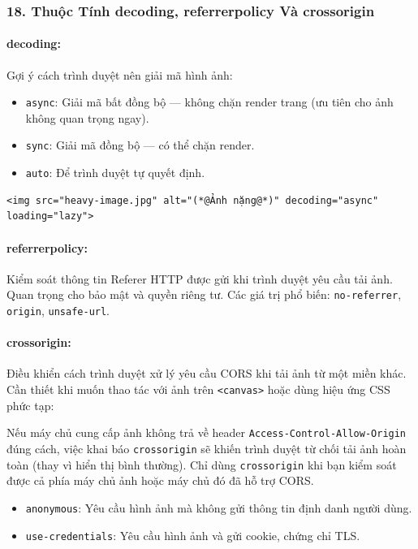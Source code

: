 \documentclass[11pt,oneside]{book}
\newcommand{\codeinline}[1]{\textcolor{accentOrange}{\texttt{#1}}}
\begin{document}
\subsubsection{18. Thuộc Tính decoding, referrerpolicy Và crossorigin}

\paragraph{decoding:}
Gợi ý cách trình duyệt nên giải mã hình ảnh:
\begin{itemize}[leftmargin=1.5em, itemsep=2pt, parsep=0pt]
    \item \codeinline{async}: Giải mã bất đồng bộ — không chặn render trang (ưu tiên cho ảnh không quan trọng ngay).
    \item \codeinline{sync}: Giải mã đồng bộ — có thể chặn render.
    \item \codeinline{auto}: Để trình duyệt tự quyết định.
\end{itemize}

\begin{codeWindow}
\begin{lstlisting}[language=HTML5]
<img src="heavy-image.jpg" alt="(*@Ảnh nặng@*)" decoding="async" loading="lazy">
\end{lstlisting}
\end{codeWindow}

\paragraph{referrerpolicy:}
Kiểm soát thông tin Referer HTTP được gửi khi trình duyệt yêu cầu tải ảnh. Quan trọng cho bảo mật và quyền riêng tư. Các giá trị phổ biến: \codeinline{no-referrer}, \codeinline{origin}, \codeinline{unsafe-url}.

\paragraph{crossorigin:}
Điều khiển cách trình duyệt xử lý yêu cầu CORS khi tải ảnh từ một miền khác. Cần thiết khi muốn thao tác với ảnh trên \codeinline{<canvas>} hoặc dùng hiệu ứng CSS phức tạp:

\begin{warnBox}
Nếu máy chủ cung cấp ảnh không trả về header \codeinline{Access-Control-Allow-Origin} đúng cách, việc khai báo \codeinline{crossorigin} sẽ khiến trình duyệt từ chối tải ảnh hoàn toàn (thay vì hiển thị bình thường). Chỉ dùng \codeinline{crossorigin} khi bạn kiểm soát được cả phía máy chủ ảnh hoặc máy chủ đó đã hỗ trợ CORS.
\end{warnBox}
\begin{itemize}[leftmargin=1.5em, itemsep=2pt, parsep=0pt]
    \item \codeinline{anonymous}: Yêu cầu hình ảnh mà không gửi thông tin định danh người dùng.
    \item \codeinline{use-credentials}: Yêu cầu hình ảnh và gửi cookie, chứng chỉ TLS.
\end{itemize}
\end{document}
